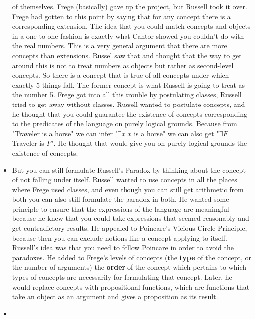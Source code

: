 \documentclass[12pt]{article}
\theoremstyle{definition}
\begin{document}
\begin{itemize}
        of themselves. Frege (basically) gave up the project, but Russell took
        it over. Frege had gotten to this point by saying that for any concept
        there is a corresponding extension. The idea that you could match
        concepts and objects in a one-to-one fashion is exactly what Cantor
        showed you couldn't do with the real numbers. This is a very general
        argument that there are more concepts than extensions. Russel saw that
        and thought that the way to get around this is not to treat numbers as
        objects but rather as second-level concepts. So there is a concept that
        is true of all concepts under which exactly 5 things fall. The former
        concept is what Russell is going to treat as the number 5. Frege got
        into all this trouble by postulating classes, Russell tried to get away
        without classes. Russell wanted to postulate concepts, and he thought
        that you could guarantee the existence of concepts corresponding to the
        predicates of the language on purely logical grounds. Because from
        "Traveler is a horse" we can infer "$\exists x$ $x$ is a horse" we can
        also get "$\exists F$ Traveler is $F$". He thought that would give you
        on purely logical grounds the existence of concepts.
    \item
        But you can still formulate Russell's Paradox by thinking about the
        concept of not falling under itself. Russell wanted to use concepts in
        all the places where Frege used classes, and even though you can still
        get arithmetic from both you can also still formulate the paradox in
        both. He wanted some principle to ensure that the expressions of the
        language are meaningful because he knew that you could take expressions
        that seemed reasonably and get contradictory results. He appealed to
        Poincare's Vicious Circle Principle, because then you can exclude
        notions like a concept applying to itself. Russell's idea was that you
        need to follow Poincare in order to avoid the paradoxes. He added to
        Frege's levels of concepts (the \textbf{type} of the concept, or the
        number of arguments) the \textbf{order} of the concept which pertains
        to which types of concepts are necessarily for formulating that
        concept. Later, he would replace concepts with propositional functions,
        which are functions that take an object as an argument and gives a
        proposition as its result.
    \item

\end{itemize}
\end{document}
